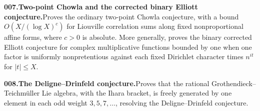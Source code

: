\documentclass[11pt,a4paper]{article}
\begin{document}
  \par \begin{minipage}{\linewidth}
  \fontsize{10.5}{12.6}\selectfont\RaggedRight
  \hypertarget{result 007}{}
  {\bfseries\textcolor{muted}{007.}\enspace Two-point Chowla and the corrected binary Elliott conjecture.}\enspace Proves the ordinary two-point Chowla conjecture, with a bound $O(X/(\log X)^c)$ for Liouville correlation sums along fixed nonproportional affine forms, where $c>0$ is absolute. More generally, proves the binary corrected Elliott conjecture for complex multiplicative functions bounded by one when one factor is uniformly nonpretentious against each fixed Dirichlet character times $n^{it}$ for $|t|\le X$.\par
  \end{minipage}\par\vspace{5pt}



  \par \begin{minipage}{\linewidth}
  \fontsize{10.5}{12.6}\selectfont\RaggedRight
  \hypertarget{result 008}{}
  {\bfseries\textcolor{muted}{008.}\enspace The Deligne--Drinfeld conjecture.}\enspace Proves that the rational Grothendieck--Teichm\"uller Lie algebra, with the Ihara bracket, is freely generated by one element in each odd weight $3,5,7,\ldots$, resolving the Deligne--Drinfeld conjecture.\par
  \end{minipage}\par\vspace{5pt}
\end{document}
